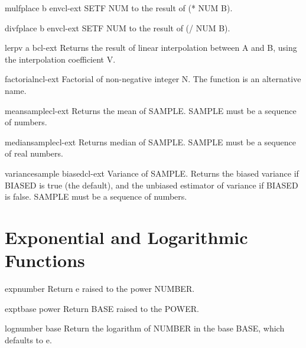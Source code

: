 \begin{macro}{mulf}{place b \env env}{cl-ext}{}
  SETF NUM to the result of (* NUM B).
\end{macro}

\begin{macro}{divf}{place b \env env}{cl-ext}{}
  SETF NUM to the result of (/ NUM B).
\end{macro}

\begin{function}{lerp}{v a b}{cl-ext}{}
  Returns the result of linear interpolation between A and B, using the
interpolation coefficient V.
\end{function}

\begin{function}{factorial}{n}{cl-ext}{}
  Factorial of non-negative integer N. The function \fun{!} is an
  alternative name.
\end{function}

\begin{function}{mean}{sample}{cl-ext}{}
  Returns the mean of SAMPLE. SAMPLE must be a sequence of numbers.
\end{function}

\begin{function}{median}{sample}{cl-ext}{}
  Returns median of SAMPLE. SAMPLE must be a sequence of real numbers.
\end{function}

\begin{function}{variance}{sample \key biased}{cl-ext}{}
  Variance of SAMPLE. Returns the biased variance if BIASED is true (the default),
and the unbiased estimator of variance if BIASED is false. SAMPLE must be a
sequence of numbers.
\end{function}

\section{Exponential and Logarithmic Functions}
\label{sec:expon-logar-funct}

\begin{function}{exp}{number}{}{}
  Return e raised to the power NUMBER.
\end{function}

\begin{function}{expt}{base power}{}{}
  Return BASE raised to the POWER.
\end{function}

\begin{function}{log}{number \op base}{}{}
  Return the logarithm of NUMBER in the base BASE, which defaults to e.
\end{function}

